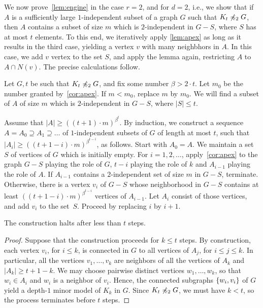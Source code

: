 We now prove~\cref{lem:engine} in the case $r=2$, and for $d=2$, i.e., we show  that if $A$ is a sufficiently large $1$-independent subset of a graph $G$ such that $K_t\not\preccurlyeq_2 G$, then $A$ contains a subset of size $m$
which is  $2$-independent in  $G-S$, where $S$ has at most $t$ elements. 
To this end, we iteratively apply \cref{lem:apex} as long as  it results in the third case, yielding a vertex $v$ with many neighbhors in $A$. In this case, we add $v$ vertex to the set $S$, and apply the lemma again,
restricting $A$ to $A\cap N(v)$. 
The precise calculations follow.

Let $G,t$ be such that $K_t\not\preccurlyeq_2 G$, and fix some number $\beta>2\cdot t$. Let $m_0$ be the number granted by~\cref{cor:apex}. If $m<m_0$, replace $m$ by $m_0$. We will find 
a subset of $A$ of size $m$ which is $2$-independent in $G-S$, where $|S|\le t$.


Assume that $|A|\ge ((t+1)\cdot m)^{\beta^{t}}$. By induction, we
 construct a sequence  $A=A_0\supseteq A_1\supseteq\ldots$ 
of $1$-independent subsets of $G$
of length at most $t$,
such that $|A_i|\ge ((t+1-i)\cdot m)^{\beta^{t-i}}$,
 as follows. Start with $A_0=A$. We maintain a set $S$ of vertices of $G$ which is initially empty.
For $i=1,2,\ldots$,
 apply~\cref{cor:apex} to the graph $G-S$ playing the role of $G$, 
$t-i$ playing the role of $k$ and $A_{i-1}$
 playing the role of $A$.
If $A_{i-1}$ contains a $2$-independent set of size $m$ in $G-S$, terminate.
 Otherwise, there is a vertex $v_i$ of $G-S$
 whose neighborhood in $G-S$ contains at least
 $((t+1-i)\cdot m)^{\beta^{t-i}}$ vertices of $A_{i-1}$.
 Let $A_{i}$ consist of those vertices, and add $v_i$
 to the set~$S$.  
  Proceed by replacing $i$ by $i+1$.

\begin{claim}\label{claim:at-most-t}
	The construction halts after less than $t$ steps.
\end{claim}
\begin{proof}
Suppose that the construction proceeds for $k\le t$ steps.
By construction, each vertex $v_i$, for $i\le k$, is connected in $G$
 to all vertices of $A_{j}$, for $i\le j\le k$. In particular, all the vertices $v_1,\ldots,v_k$ are neighbors of all the vertices of $A_{k}$
 and $|A_k|\ge t+1-k$.
We may choose pairwise distinct vertices $w_1,\ldots,w_k$,
 so that $w_i\in A_i$ and $w_i$ is a neighbor of $v_i$.
 Hence, the connected subgraphs $\{w_i,v_i\}$ of $G$ yield a depth-$1$ minor model of $K_k$ in $G$.
 Since $K_t\not\preccurlyeq_2 G$, we must have $k<t$, so the process terminates before $t$ steps.
 \end{proof}
 
